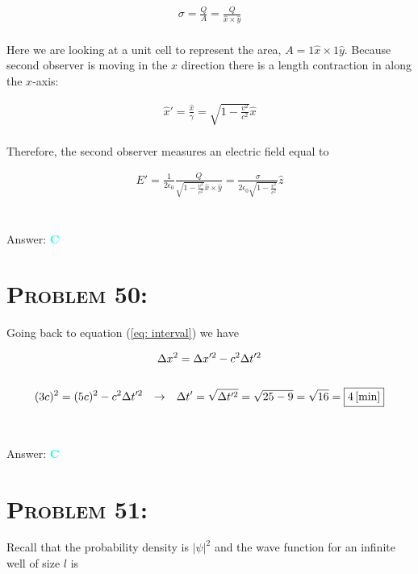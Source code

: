 \documentclass{article}
\begin{document}
\begin{gather}
\sigma = \frac{Q}{A} = \frac{Q}{\hat{x} \times \hat{y}}\nonumber
\end{gather}
\\
Here we are looking at a unit cell to represent the area, $A =1\hat{x} \times 1\hat{y}$. Because second observer is moving in the $x$ direction there is a length contraction in along the $x$-axis:

\begin{gather}
\hat{x}' = \frac{\hat{x}}{\gamma} = \sqrt{1 - \frac{v^{2}}{c^{2}}}  \hat{x}  \nonumber
\end{gather}
\\
Therefore, the second observer measures an electric field equal to 

\begin{gather}
E' = \frac{1}{2 \epsilon_{0}} \frac{Q}{\sqrt{1 - \frac{v^{2}}{c^{2}}}  \hat{x} \times \hat{y}} = \boxed{\frac{\sigma}{2 \epsilon_{0} \sqrt{1 - \frac{v^{2}}{c^{2}}}}\hat{z}}\nonumber
\end{gather}
\\\\
Answer: \textbf{\textcolor{cyan}C}\\


\section{\textsc{Problem 50:}} Going back to equation (\ref{eq: interval}) we have

\begin{gather}
\Delta x^{2} = \Delta x'^{2} -c^{2} \Delta t'^{2}\nonumber\\
\nonumber\\
(3c)^{2} = (5c)^{2} - c^{2}\Delta t'^{2} \hspace{.1in} \rightarrow \hspace{.1in} \Delta t' = \sqrt{\Delta t'^{2} }= \sqrt{25-9} = \sqrt{16} = \boxed{\unit[4]{[min]}}\nonumber
\end{gather}
\\\\
Answer: \textbf{\textcolor{cyan}C}\\


\section{\textsc{Problem 51:}} Recall that the probability density is $\left| \psi  \right|^{2}$ and the wave function for an infinite well of size $l$ is
\end{document}
